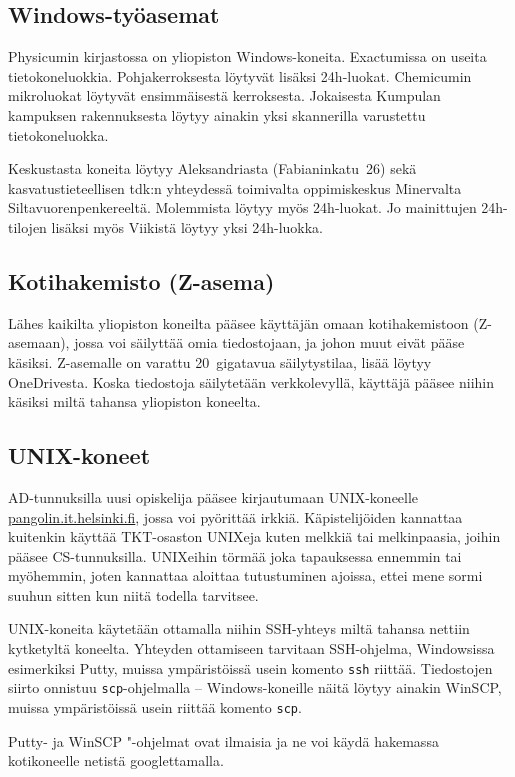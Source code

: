 \documentclass[a5paper, 8pt, twocolumn]{book} %
\numberwithin{equation}{section}
\begin{document}
\subsection*{Windows-työasemat}
Physicumin kirjastossa on yliopiston Windows-koneita. Exactumissa on useita tieto\-kone\-luokkia.
Pohjakerroksesta löytyvät lisäksi 24h-luokat. Chemicumin mikroluokat löytyvät ensimmäisestä
kerroksesta.  Jokaisesta Kumpulan kampuksen rakennuksesta
löytyy ainakin yksi skannerilla
varustettu tieto\-kone\-luokka.

Keskustasta koneita löytyy Aleksandriasta
(Fabianinkatu~26) sekä kasvatus\-tieteellisen
tdk:n yhteydessä toimivalta
oppimiskeskus Minervalta Siltavuorenpenkereeltä.
Molemmista löytyy myös 24h-luokat.
Jo mainittujen 24h-tilojen lisäksi
myös Viikistä löytyy yksi 24h-luokka.

\subsection*{Kotihakemisto (Z-asema)}
Lähes kaikilta yliopiston koneilta pääsee käyttäjän omaan kotihakemistoon (Z-asemaan), jossa voi säilyttää omia tiedostojaan, ja johon
muut eivät pääse käsiksi. Z-asemalle on varattu 20~giga\-tavua säilytys\-tilaa, lisää löytyy OneDrivesta. Koska tiedostoja
säilytetään verkkolevyllä, käyttäjä pääsee
niihin käsiksi miltä tahansa yliopiston koneelta.

\subsection*{UNIX-koneet}
AD-tunnuksilla uusi opiskelija pääsee kirjautumaan UNIX-koneelle \url{pangolin.it.helsinki.fi}, jossa voi pyörittää irkkiä. Käpistelijöiden kannattaa kuitenkin käyttää TKT-osaston UNIXeja kuten melkkiä tai melkin\-paasia, joihin pääsee CS-tunnuksilla. UNIXeihin törmää joka
tapauksessa ennemmin tai myöhemmin,
joten kannattaa aloittaa tutustuminen ajoissa,
ettei mene sormi suuhun sitten kun niitä
todella tarvitsee.

UNIX-koneita käytetään ottamalla niihin
SSH-yhteys miltä tahansa nettiin kytketyltä
koneelta. Yhteyden ottamiseen tarvitaan SSH-ohjelma,
Windowsissa esimerkiksi Putty, muissa ympäristöissä usein komento \texttt{ssh} riittää. Tiedostojen siirto onnistuu
\texttt{scp}-ohjelmalla -- Windows-koneille näitä löytyy ainakin WinSCP, muissa ympäristöissä usein riittää komento \texttt{scp}. 

Putty- ja WinSCP "-ohjelmat ovat ilmaisia ja ne
voi käydä hakemassa kotikoneelle netistä
googlettamalla.
\end{document}
